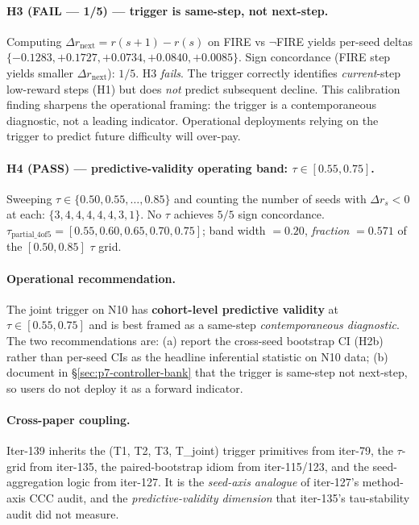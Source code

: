 \documentclass{article}
\begin{document}
\paragraph{H3 (FAIL --- 1/5) --- trigger is same-step, not next-step.}
Computing $\Delta r_\mathrm{next} = r(s{+}1) - r(s)$ on FIRE vs
$\neg$FIRE yields per-seed deltas $\{-0.1283, +0.1727, +0.0734,
+0.0840, +0.0085\}$.  Sign concordance (FIRE step yields smaller
$\Delta r_\mathrm{next}$): $1/5$.  H3 \emph{fails}. The trigger
correctly identifies \emph{current}-step low-reward steps (H1) but does
\emph{not} predict subsequent decline. This calibration finding
sharpens the operational framing: the trigger is a contemporaneous
diagnostic, not a leading indicator. Operational deployments relying
on the trigger to predict future difficulty will over-pay.

\paragraph{H4 (PASS) --- predictive-validity operating band: $\tau \in [0.55, 0.75]$.}
Sweeping $\tau \in \{0.50, 0.55, \ldots, 0.85\}$ and counting the number
of seeds with $\Delta r_s < 0$ at each:
$\{3, 4, 4, 4, 4, 4, 3, 1\}$.  No $\tau$ achieves $5/5$ sign concordance.
$\tau_\mathrm{partial\_4of5} = [0.55, 0.60, 0.65, 0.70, 0.75]$; band
width $= 0.20$, \emph{fraction} $= 0.571$ of the $[0.50, 0.85]$ $\tau$
grid.

\paragraph{Operational recommendation.}
The joint trigger on N10 has \textbf{cohort-level predictive validity}
at $\tau \in [0.55, 0.75]$ and is best framed as a same-step
\emph{contemporaneous diagnostic}. The two recommendations are:
(a) report the cross-seed bootstrap CI (H2b) rather than per-seed CIs as
the headline inferential statistic on N10 data; (b) document in
§\ref{sec:p7-controller-bank} that the trigger is same-step not
next-step, so users do not deploy it as a forward indicator.

\paragraph{Cross-paper coupling.}
Iter-139 inherits the (T1, T2, T3, T\_joint) trigger primitives from
iter-79, the $\tau$-grid from iter-135, the paired-bootstrap idiom from
iter-115/123, and the seed-aggregation logic from iter-127.  It is the
\emph{seed-axis analogue} of iter-127's method-axis CCC audit, and the
\emph{predictive-validity dimension} that iter-135's tau-stability audit
did not measure.
\end{document}
